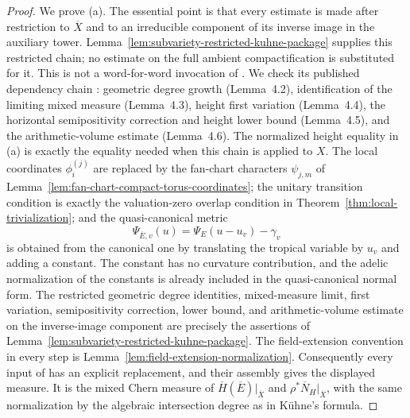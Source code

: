 \documentclass[10pt,a4paper]{amsart}
\theoremstyle{plain}
\theoremstyle{plain}
\numberwithin{equation}{section}
\providecommand{\bN}{\overline{N}}
\providecommand{\bE}{\overline{E}}
\begin{document}
\begin{proof}
	We prove (a).  The essential point is that every estimate is made after
	restriction to \(\overline X\) and to an irreducible component of its inverse
	image in the auxiliary tower.  Lemma~\ref{lem:subvariety-restricted-kuhne-package}
	supplies this restricted chain; no estimate on the full ambient
	compactification is substituted for it.  This is not a word-for-word invocation of
	\cite[Proposition~4.1]{Ku1}.  We check its published dependency chain
	\cite[Lemmas~4.2--4.6]{Ku1}: geometric degree growth (Lemma~4.2),
	identification of the limiting mixed measure (Lemma~4.3), height first
	variation (Lemma~4.4), the horizontal semipositivity correction and height
	lower bound (Lemma~4.5), and the arithmetic-volume estimate (Lemma~4.6).
	The normalized height equality
	in (a) is exactly the equality needed when this chain is applied to \(X\).
	The local coordinates
	\(\phi_i^{(j)}\) are replaced by the fan-chart characters
	\(\psi_{j,m}\) of Lemma~\ref{lem:fan-chart-compact-torus-coordinates}; the
	unitary transition condition is exactly the valuation-zero overlap condition in
	Theorem~\ref{thm:local-trivialization}; and the quasi-canonical metric
	\[
	\Psi_{\bE,v}(u)=\Psi_E(u-u_v)-\gamma_v
	\]
	is obtained from the canonical one by translating the tropical variable by
	\(u_v\) and adding a constant.  The constant has no curvature contribution,
	and the adelic normalization of the constants is already included in the
	quasi-canonical normal form.  The restricted geometric degree identities,
	mixed-measure limit, first variation, semipositivity correction, lower bound,
	and arithmetic-volume estimate on the inverse-image component are precisely
	the assertions of Lemma~\ref{lem:subvariety-restricted-kuhne-package}.
	The field-extension convention in every step is
	Lemma~\ref{lem:field-extension-normalization}.
	Consequently every input of \cite[Lemmas~4.2--4.6]{Ku1} has an explicit
	replacement, and their assembly gives the displayed measure.  It is the mixed
	Chern measure of
	\(\overline H(\bE)|_{\overline X}\) and \(\rho^*\bN_H|_{\overline X}\), with
	the same normalization by the algebraic intersection degree as in K\"uhne's
	formula.
	

\end{proof}
\end{document}

